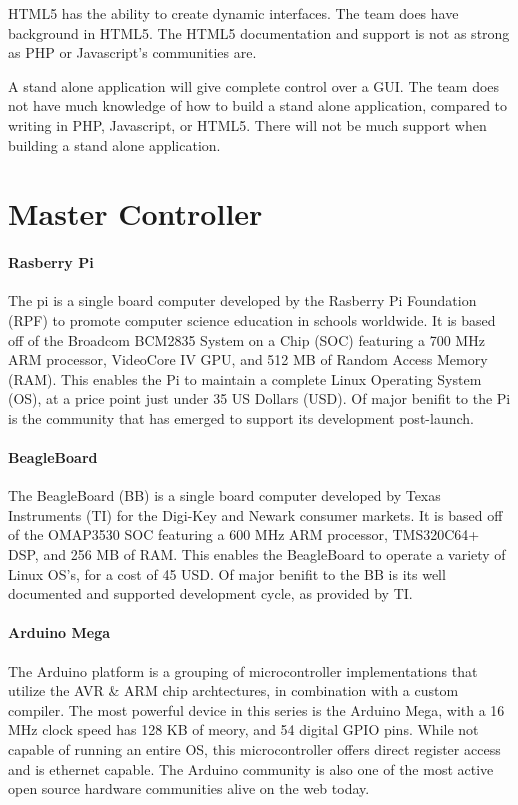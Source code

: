 HTML5 has the ability to create dynamic interfaces.
The team does have background in HTML5.
The HTML5 documentation and support is not as strong as PHP or Javascript's communities are.

A stand alone application will give complete control over a GUI.
The team does not have much knowledge of how to build a stand alone application, compared to writing in PHP, Javascript, or HTML5.
There will not be much support when building a stand alone application.

\section{Master Controller}
\paragraph{Rasberry Pi}
The \gls{pi} is a single board computer developed by the Rasberry Pi Foundation (RPF) to promote computer science education in schools worldwide.
It is based off of the Broadcom BCM2835 System on a Chip (SOC) featuring a 700 MHz ARM processor, VideoCore IV GPU, and 512 MB of Random Access Memory (RAM).
This enables the Pi to maintain a complete Linux Operating System (OS), at a price point just under 35 US Dollars (USD).
Of major beniﬁt to the Pi is the community that has emerged to support its development post-launch.

\paragraph{BeagleBoard}
The BeagleBoard (BB) is a single board computer developed by Texas Instruments (TI) for the Digi-Key and Newark consumer markets.
It is based off of the OMAP3530 SOC featuring a 600 MHz ARM processor, TMS320C64+ DSP, and 256 MB of RAM.
This enables the BeagleBoard to operate a variety of Linux OS’s, for a cost of 45 USD.
Of major beniﬁt to the BB is its well documented and supported development cycle, as provided by TI.

\paragraph{Arduino Mega}
The Arduino platform is a grouping of microcontroller implementations that utilize the AVR \& ARM chip archtectures, in combination with a custom compiler.
The most powerful device in this series is the Arduino Mega, with a 16 MHz clock speed has 128 KB of meory, and 54 digital GPIO pins.
While not capable of running an entire OS, this microcontroller offers direct register access and is ethernet capable.
The Arduino community is also one of the most active open source hardware communities alive on the web today.


